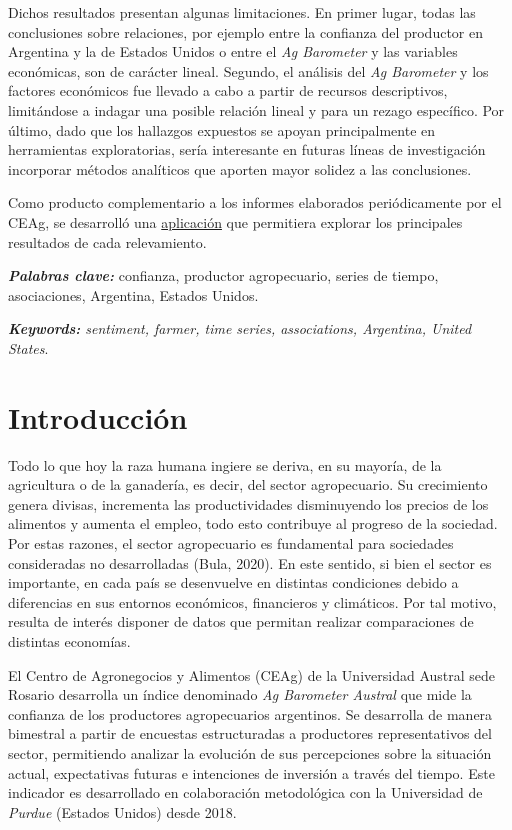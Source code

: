 \documentclass[12pt]{article}
\begin{document}
Dichos resultados presentan algunas limitaciones. En primer lugar, todas
las conclusiones sobre relaciones, por ejemplo entre la confianza del
productor en Argentina y la de Estados Unidos o entre el \emph{Ag
Barometer} y las variables económicas, son de carácter lineal. Segundo,
el análisis del \emph{Ag Barometer} y los factores económicos fue
llevado a cabo a partir de recursos descriptivos, limitándose a indagar
una posible relación lineal y para un rezago específico. Por último,
dado que los hallazgos expuestos se apoyan principalmente en
herramientas exploratorias, sería interesante en futuras líneas de
investigación incorporar métodos analíticos que aporten mayor solidez a
las conclusiones.

Como producto complementario a los informes elaborados periódicamente
por el CEAg, se desarrolló una
\href{https://patri7.shinyapps.io/ag_barometer_austral/}{aplicación} que
permitiera explorar los principales resultados de cada relevamiento.

\textbf{\emph{Palabras clave:}} confianza, productor agropecuario,
series de tiempo, asociaciones, Argentina, Estados Unidos.

\emph{\textbf{Keywords:} sentiment, farmer, time series, associations,
Argentina, United States}.

\newpage

\tableofcontents

\newpage
\rhead{\nouppercase{\leftmark}}

\section{Introducción}\label{introducciuxf3n}

Todo lo que hoy la raza humana ingiere se deriva, en su mayoría, de la
agricultura o de la ganadería, es decir, del sector agropecuario. Su
crecimiento genera divisas, incrementa las productividades disminuyendo
los precios de los alimentos y aumenta el empleo, todo esto contribuye
al progreso de la sociedad. Por estas razones, el sector agropecuario es
fundamental para sociedades consideradas no desarrolladas (Bula, 2020).
En este sentido, si bien el sector es importante, en cada país se
desenvuelve en distintas condiciones debido a diferencias en sus
entornos económicos, financieros y climáticos. Por tal motivo, resulta
de interés disponer de datos que permitan realizar comparaciones de
distintas economías.

El Centro de Agronegocios y Alimentos (CEAg) de la Universidad Austral
sede Rosario desarrolla un índice denominado \emph{Ag Barometer Austral}
que mide la confianza de los productores agropecuarios argentinos. Se
desarrolla de manera bimestral a partir de encuestas estructuradas a
productores representativos del sector, permitiendo analizar la
evolución de sus percepciones sobre la situación actual, expectativas
futuras e intenciones de inversión a través del tiempo. Este indicador
es desarrollado en colaboración metodológica con la Universidad de
\emph{Purdue} (Estados Unidos) desde 2018.
\end{document}
